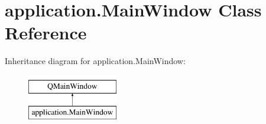 \hypertarget{classapplication_1_1MainWindow}{}\section{application.\+Main\+Window Class Reference}
\label{classapplication_1_1MainWindow}
Inheritance diagram for application.\+Main\+Window\+:\begin{figure}[H]
\begin{center}
\leavevmode
\includegraphics[height=2.000000cm]{classapplication_1_1MainWindow}
\end{center}
\end{figure}
